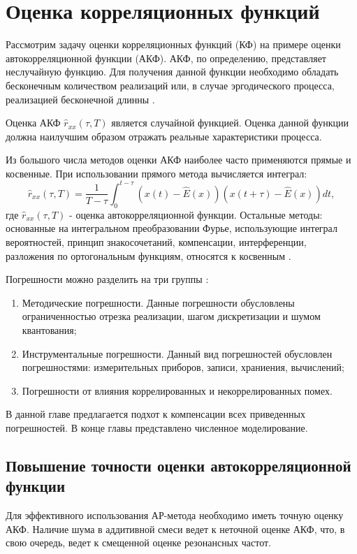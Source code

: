 \chapter{Оценка корреляционных функций}

Рассмотрим задачу оценки корреляционных функций (КФ) на примере оценки автокорреляционной функции (АКФ). АКФ, по определению, представляет неслучайную функцию.
Для получения данной функции необходимо обладать бесконечным количеством реализаций или, в случае эргодического процесса, реализацией бесконечной длинны \cite{bolshakov-book}.

Оценка АКФ ${\hat{r}_{xx}(\tau, T)}$ является случайной функцией. Оценка данной функции должна наилучшим образом отражать реальные характеристики процесса.

Из большого числа методов оценки АКФ наиболее часто применяются прямые и косвенные. При использовании прямого метода вычисляется интеграл:
\begin{equation}
	\label{eq:acf_integral_basic}
	\hat{r}_{xx}(\tau, T) = \frac{1}{T-\tau} \int_{0}^{t-\tau} (x(t) - \hat{E}(x))(x(t+\tau) - \hat{E}(x))dt,
\end{equation}
где ${\hat{r}_{xx}(\tau, T)}$ -  оценка автокорреляционной функции. Остальные методы: основанные на интегральном преобразовании Фурье, использующие интеграл вероятностей, принцип
знакосочетаний, компенсации, интерференции, разложения по ортогональным функциям, относятся к косвенным \cite{bolshakov-book}.

Погрешности можно разделить на три группы \cite{bolshakov-book}:
\begin{enumerate}
	\item Методические погрешности. Данные погрешности обусловлены ограниченностью отрезка реализации, шагом дискретизации и шумом квантования;
	\item Инструментальные погрешности. Данный вид погрешностей обусловлен погрешностями: измерительных приборов, записи, храниения, вычислений;
	\item Погрешности от влияния коррелированных и некоррелированных помех.
\end{enumerate}

В данной главе предлагается подхот к компенсации всех приведенных погрешностей. В конце главы представлено численное моделирование.

\section{Повышение точности оценки автокорреляционной функции}
Для эффективного использования АР-метода необходимо иметь точную оценку АКФ. Наличие шума в аддитивной смеси ведет к неточной
оценке АКФ, что, в свою очередь, ведет к смещенной оценке резонансных частот.

